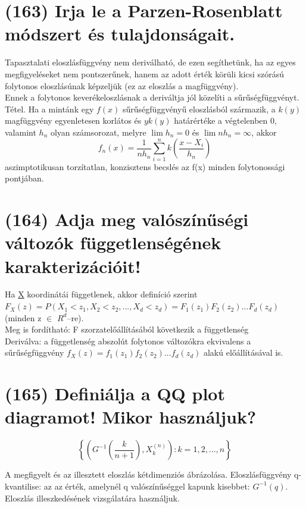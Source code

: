 \documentclass[12p]{article}
\begin{document}
\section{(163) Irja le a Parzen-Rosenblatt módszert és tulajdonságait.}

Tapasztalati eloszlásfüggvény nem deriválható, de ezen segíthetünk, ha az egyes megfigyeléseket nem pontszerűnek, hanem az adott érték körüli kicsi szórású folytonos eloszlásúnak képzeljük (ez az eloszlás a magfüggvény).\\
Ennek a folytonos keverékeloszlásnak a deriváltja jól közelíti a sűrűségfüggvényt.\\
Tétel. Ha a mintánk egy $f(x)$ sűrűségfüggvényű
eloszlásból származik, a $k(y)$ magfüggvény
egyenletesen korlátos és $yk(y)$ határértéke a
végtelenben 0, valamint $h_n$ olyan számsorozat,
melyre $\lim h_n = 0$ és $\lim nh_n = \infty$, akkor
$$f_n(x) = \frac{1}{nh_n} \sum^{n}_{i=1}k\left(\frac{x-X_i}{h_n}\right)$$ 
aszimptotikusan torzítatlan, konzisztens becslés az f(x) minden folytonossági pontjában.

\section{(164) Adja meg valószínűségi változók függetlenségének karakterizációit!}

Ha \underline{X} koordinátái függetlenek, akkor definíció szerint\\
$F_X(z)=P(X_1<z_1, X_2< z_2,..., X_d<z_d)=F_1(z_1)F_2(z_2)...F_d(z_d)$ (minden z $\in$ $R^d$–re).\\
Meg is fordítható: F szorzatelőállításából következik a függetlenség\\
Deriválva: a függetlenség abszolút folytonos változókra ekvivalens a sűrűségfüggvény 
$f_X(z)=f_1(z_1)f_2(z_2)...f_d(z_d)$ alakú előállításával is.

\section{(165) Definiálja a QQ plot diagramot! Mikor használjuk?}

$$\left\{\left(G^{-1}\left(\frac{k}{n+1}\right), X_k^{(n)}\right):k=1,2,...,n\right\}$$

A megfigyelt és az illesztett eloszlás kétdimenziós ábrázolása. Eloszlásfüggvény q-kvantilise: az az érték, amelynél q valószínűséggel kapunk kisebbet: $G^{-1}(q)$.\\
Eloszlás illeszkedésének vizsgálatára használjuk.
\end{document}
